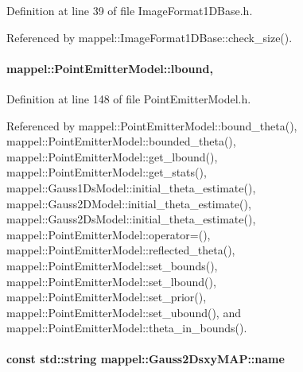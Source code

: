 Definition at line 39 of file Image\+Format1\+D\+Base.\+h.



Referenced by mappel\+::\+Image\+Format1\+D\+Base\+::check\+\_\+size().

\paragraph[{\texorpdfstring{lbound}{lbound}}]{ mappel\+::\+Point\+Emitter\+Model\+::lbound\hspace{0.3cm}{\ttfamily [protected]}, {\ttfamily [inherited]}}\hypertarget{classmappel_1_1PointEmitterModel_a889bc82f74cfa654da121e5770296ab2}{}\label{classmappel_1_1PointEmitterModel_a889bc82f74cfa654da121e5770296ab2}


Definition at line 148 of file Point\+Emitter\+Model.\+h.



Referenced by mappel\+::\+Point\+Emitter\+Model\+::bound\+\_\+theta(), mappel\+::\+Point\+Emitter\+Model\+::bounded\+\_\+theta(), mappel\+::\+Point\+Emitter\+Model\+::get\+\_\+lbound(), mappel\+::\+Point\+Emitter\+Model\+::get\+\_\+stats(), mappel\+::\+Gauss1\+Ds\+Model\+::initial\+\_\+theta\+\_\+estimate(), mappel\+::\+Gauss2\+D\+Model\+::initial\+\_\+theta\+\_\+estimate(), mappel\+::\+Gauss2\+Ds\+Model\+::initial\+\_\+theta\+\_\+estimate(), mappel\+::\+Point\+Emitter\+Model\+::operator=(), mappel\+::\+Point\+Emitter\+Model\+::reflected\+\_\+theta(), mappel\+::\+Point\+Emitter\+Model\+::set\+\_\+bounds(), mappel\+::\+Point\+Emitter\+Model\+::set\+\_\+lbound(), mappel\+::\+Point\+Emitter\+Model\+::set\+\_\+prior(), mappel\+::\+Point\+Emitter\+Model\+::set\+\_\+ubound(), and mappel\+::\+Point\+Emitter\+Model\+::theta\+\_\+in\+\_\+bounds().

\paragraph[{\texorpdfstring{name}{name}}]{\setlength{\rightskip}{0pt plus 5cm}const std\+::string mappel\+::\+Gauss2\+Dsxy\+M\+A\+P\+::name\hspace{0.3cm}{\ttfamily [static]}}\hypertarget{classmappel_1_1Gauss2DsxyMAP_a4e786341079a9399fd30a8184eac2d5c}{}\label{classmappel_1_1Gauss2DsxyMAP_a4e786341079a9399fd30a8184eac2d5c}


